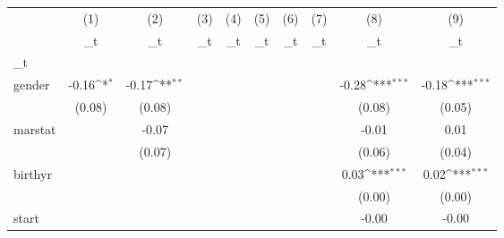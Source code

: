 \documentclass{article}
\begin{document}
{
\def\sym#1{\ifmmode^{#1}\else\(^{#1}\)\fi}
\begin{tabular}{l*{9}{c}}
\hline\hline
            &\multicolumn{1}{c}{(1)}&\multicolumn{1}{c}{(2)}&\multicolumn{1}{c}{(3)}&\multicolumn{1}{c}{(4)}&\multicolumn{1}{c}{(5)}&\multicolumn{1}{c}{(6)}&\multicolumn{1}{c}{(7)}&\multicolumn{1}{c}{(8)}&\multicolumn{1}{c}{(9)}\\
            &\multicolumn{1}{c}{\_t}&\multicolumn{1}{c}{\_t}&\multicolumn{1}{c}{\_t}&\multicolumn{1}{c}{\_t}&\multicolumn{1}{c}{\_t}&\multicolumn{1}{c}{\_t}&\multicolumn{1}{c}{\_t}&\multicolumn{1}{c}{\_t}&\multicolumn{1}{c}{\_t}\\
\hline
\_t          &                     &                     &                     &                     &                     &                     &                     &                     &                     \\
gender      &       -0.16\sym{*}  &       -0.17\sym{**} &                     &                     &                     &                     &                     &       -0.28\sym{***}&       -0.18\sym{***}\\
            &      (0.08)         &      (0.08)         &                     &                     &                     &                     &                     &      (0.08)         &      (0.05)         \\
[1em]
marstat     &                     &       -0.07         &                     &                     &                     &                     &                     &       -0.01         &        0.01         \\
            &                     &      (0.07)         &                     &                     &                     &                     &                     &      (0.06)         &      (0.04)         \\
[1em]
birthyr     &                     &                     &                     &                     &                     &                     &                     &        0.03\sym{***}&        0.02\sym{***}\\
            &                     &                     &                     &                     &                     &                     &                     &      (0.00)         &      (0.00)         \\
[1em]
start       &                     &                     &                     &                     &                     &                     &                     &       -0.00         &       -0.00         \\

\end{tabular}}
\end{document}

